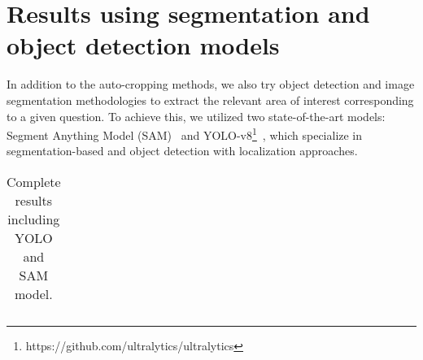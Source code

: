 \section{Results using segmentation and object detection models}

In addition to the auto-cropping methods, we also try object detection and image segmentation methodologies to extract the relevant area of interest corresponding to a given question. To achieve this, we utilized two state-of-the-art models: Segment Anything Model (SAM)~\citep{kirillov2023segment} and YOLO-v8\footnote{https://github.com/ultralytics/ultralytics}~\citep{yolo}, which specialize in segmentation-based and object detection with localization approaches. 

\begin{table}[h!]
\centering
\small
\caption{Complete results including YOLO and SAM model.}%
\begin{tabular}{l|c|rr|rr|rr}
\toprule


\end{tabular}
\end{table}
